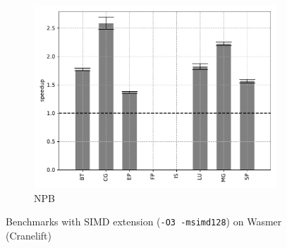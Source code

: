 \begin{figure}
\begin{subfigure}[t]{.45\textwidth}
        \includegraphics[width=\textwidth]
        {Images/6.1.RQ1/npb-wasmer-cranelift-simd.pdf}
        \caption{NPB}
    \end{subfigure}
    \caption{Benchmarks with SIMD extension (\texttt{-O3 -msimd128})
        on Wasmer (Cranelift)}
    \label{fig:rq1-wasmer-cranelift-simd}
\end{figure}

